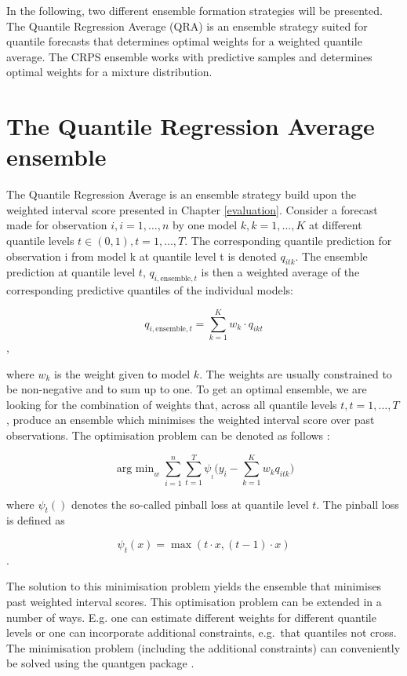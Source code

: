 \documentclass[
]{book}
\begin{document}
In the following, two different ensemble formation strategies will be presented. The Quantile Regression Average (QRA) is an ensemble strategy suited for quantile forecasts that determines optimal weights for a weighted quantile average. The CRPS ensemble works with predictive samples and determines optimal weights for a mixture distribution.

\hypertarget{the-quantile-regression-average-ensemble}{%
\section{The Quantile Regression Average ensemble}\label{the-quantile-regression-average-ensemble}}

The Quantile Regression Average \citep{nowotarskiComputingElectricitySpot2015} is an ensemble strategy build upon the weighted interval score presented in Chapter \ref{evaluation}.
Consider a forecast made for observation \(i, i = 1, \dots, n\) by one model \(k, k = 1, \dots, K\) at different quantile levels \(t \in (0,1), t=1,\dots, T\). The corresponding quantile prediction for observation i from model k at quantile level t is denoted \(q_{itk}\). The ensemble prediction at quantile level \(t\), \(q_{i, \text{ensemble},t}\) is then a weighted average of the corresponding predictive quantiles of the individual models:

\[q_{i,\text{ensemble}, t} = \sum_{k = 1}^K w_k \cdot q_{ikt}\],

where \(w_k\) is the weight given to model \(k\). The weights are usually constrained to be non-negative and to sum up to one. To get an optimal ensemble, we are looking for the combination of weights that, across all quantile levels \(t, t = 1, \dots, T\), produce an ensemble which minimises the weighted interval score over past observations. The optimisation problem can be denoted as follows \citep{ryantibshiraniQuantileStacking2020}:

\[\mathop{\text{arg min}}_{w} \sum_{i=1}^n \sum_{t=1}^T \psi_{_t} \bigg(y_i - \sum_{k=1}^K w_k q_{itk} \bigg) \]

where \(\psi_{t}()\) denotes the so-called pinball loss at quantile level \(t\). The pinball loss is defined as

\[\psi_{t}(x) = \max(t \cdot x, (t-1)\cdot x)\].

The solution to this minimisation problem yields the ensemble that minimises past weighted interval scores. This optimisation problem can be extended in a number of ways. E.g. one can estimate different weights for different quantile levels or one can incorporate additional constraints, e.g.~that quantiles not cross. The minimisation problem (including the additional constraints) can conveniently be solved using the quantgen package \citep{R-quantgen}.
\end{document}
